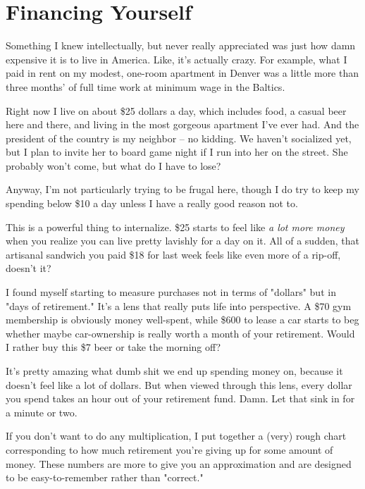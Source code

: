 \documentclass[]{book}
\begin{document}
\chapter{Financing Yourself}


Something I knew intellectually, but never really appreciated was just how damn
expensive it is to live in America. Like, it's actually crazy. For example, what
I paid in rent on my modest, one-room apartment in Denver was a little more than
three months' of full time work at minimum wage in the Baltics.

Right now I live on about \$25 dollars a day, which includes food, a casual beer
here and there, and living in the most gorgeous apartment I've ever had. And the
president of the country is my neighbor -- no kidding. We haven't socialized
yet, but I plan to invite her to board game night if I run into her on the
street. She probably won't come, but what do I have to lose?

Anyway,  I'm not particularly trying to be frugal
here, though I do try to keep my spending below \$10 a day unless I have a
really good reason not to.

This is a powerful thing to internalize. \$25 starts to feel like \emph{a lot
more money} when you realize you can live pretty lavishly for a day on it. All
of a sudden, that artisanal sandwich you paid \$18 for last week feels like even
more of a rip-off, doesn't it?

I found myself starting to measure purchases not in terms of "dollars" but in
"days of retirement." It's a lens that really puts life into perspective. A \$70
gym membership is obviously money well-spent, while \$600 to lease a car starts
to beg whether maybe car-ownership is really worth a month of your retirement.
Would I rather buy this \$7 beer or take the morning off?

 It's pretty amazing what dumb shit we end up spending
money on, because it doesn't feel like a lot of dollars. But when viewed through
this lens, every dollar you spend takes an hour out of your retirement fund.
Damn. Let that sink in for a minute or two.

If you don't want to do any multiplication, I put together a (very) rough chart
corresponding to how much retirement you're giving up for some amount of money.
These numbers are more to give you an approximation and are designed to be
easy-to-remember rather than "correct."
\end{document}
